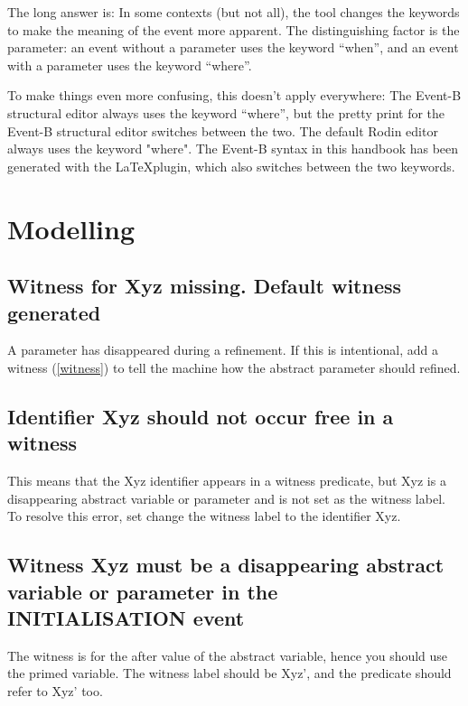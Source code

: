 The long answer is: In some contexts (but not all), the tool changes the keywords to make the meaning of the event more apparent.  The distinguishing factor is the parameter: an event without a parameter uses the keyword ``when'', and an event with a parameter uses the keyword ``where''.

To make things even more confusing, this doesn't apply everywhere: The Event-B structural editor always uses the keyword ``where'', but the pretty print for the Event-B structural editor switches between the two.  The default Rodin editor always uses the keyword "where". The Event-B syntax in this handbook has been generated with the \LaTeX plugin, which also switches between the two keywords.

\section{Modelling}

\subsection{Witness for \textsf{Xyz} missing. Default witness generated}

A parameter has disappeared during a refinement. If this is intentional, add a witness (\ref{witness}) to tell the machine how the abstract parameter should refined. 

\subsection{Identifier \textsf{Xyz} should not occur free in a witness}

This means that the \textsf{Xyz} identifier appears in a witness predicate, but \textsf{Xyz} is a disappearing abstract variable or parameter and is not set as the witness label. To resolve this error, set change the witness label to the identifier \textsf{Xyz}.

\subsection{Witness \textsf{Xyz} must be a disappearing abstract variable or parameter in the \textsf{INITIALISATION} event}

The witness is for the after value of the abstract variable, hence you should use the primed variable. The witness label should be \textsf{Xyz'}, and the predicate should refer to \textsf{Xyz'} too. 

